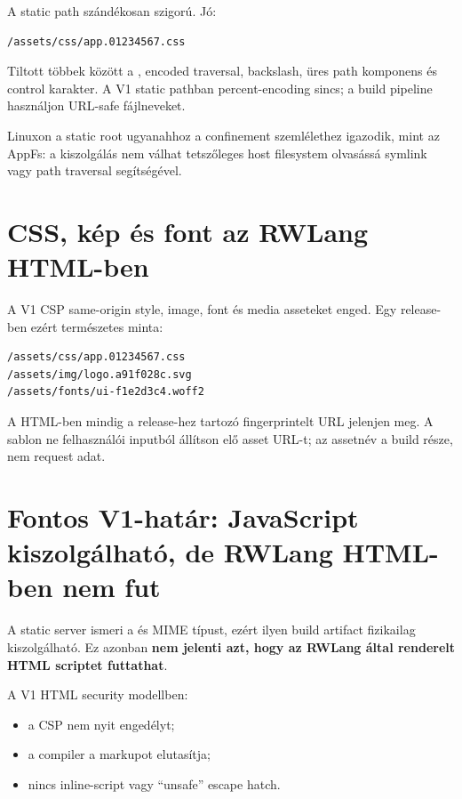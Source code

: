 A static path szándékosan szigorú. Jó:

\begin{lstlisting}
/assets/css/app.01234567.css
\end{lstlisting}

Tiltott többek között a , encoded traversal, backslash, üres path komponens és control karakter. A V1 static pathban percent-encoding sincs; a build pipeline használjon URL-safe fájlneveket.

Linuxon a static root ugyanahhoz a confinement szemlélethez igazodik, mint az AppFs: a kiszolgálás nem válhat tetszőleges host filesystem olvasássá symlink vagy path traversal segítségével.

\section{CSS, kép és font az RWLang HTML-ben}

A V1 CSP same-origin style, image, font és media asseteket enged. Egy release-ben ezért természetes minta:

\begin{lstlisting}
/assets/css/app.01234567.css
/assets/img/logo.a91f028c.svg
/assets/fonts/ui-f1e2d3c4.woff2
\end{lstlisting}

A HTML-ben mindig a release-hez tartozó fingerprintelt URL jelenjen meg. A sablon ne felhasználói inputból állítson elő asset URL-t; az assetnév a build része, nem request adat.

\section{Fontos V1-határ: JavaScript kiszolgálható, de RWLang HTML-ben nem fut}

A static server ismeri a  és  MIME típust, ezért ilyen build artifact fizikailag kiszolgálható. Ez azonban \textbf{nem jelenti azt, hogy az RWLang által renderelt HTML scriptet futtathat}.

A V1 HTML security modellben:

\begin{itemize}
  \item a CSP nem nyit  engedélyt;
  \item a compiler a  markupot elutasítja;
  \item nincs inline-script vagy ``unsafe'' escape hatch.
\end{itemize}

